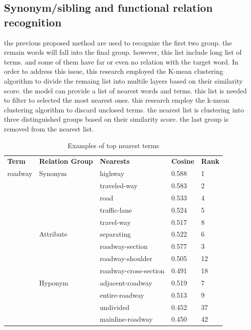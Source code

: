 \documentclass[Journal, InsideFigs, DoubleSpace]{ascelike} %
\begin{document}
\subsection{Synonym/sibling and functional relation recognition}
the previous proposed method are used to recognize the first two group. the remain words will fall into the final group. however, this list include long list of terms. and some of them have far or even no relation with the target word. In order to address this issue, this research employed the K-mean clustering algorithm \cite{macqueen67} to divide the remaing list into multile layers based on their similarity score. the model can provide a list of nearest words and terms. this list is needed to filter to selected the most nearest ones. this research employ the k-mean clustering algorithm \cite{macqueen67} to discard unclosed terms. the nearest list is clustering into three distinguished groups based on their similarity score. the last group is removed from the nearest list.
%
\begin{table} [t]
	\caption{Examples of top nearest terms}
	\label{table:term_clustering}
	\centering
	\small
	\renewcommand{\arraystretch}{1.25}
	\begin{tabular}{l l l l l}
		\hline
		\textbf{Term}	&\textbf{Relation Group}	& \textbf{Nearests} & \textbf{Cosine} & \textbf{Rank}\\
		roadway			&Synonym					& highway & 0.588 & 1\\
						&							& traveled-way & 0.583 & 2\\
						&							& road & 0.533 & 4\\						
						&							& traffic-lane & 0.524 &5\\ 						
						&							& travel-way & 0.517 & 8\\  \cmidrule{2-5}
						&Attribute					& separating & 0.522 &6\\
						&							& roadway-section & 0.577 & 3\\						
						&							& roadway-shoulder & 0.505 & 12\\
						&							& roadway-cross-section & 0.491 & 18\\\cmidrule{2-5}						
						&Hyponym					& adjacent-roadway & 0.519 & 7\\
						&							& entire-roadway & 0.513 & 9\\
						&							& undivided & 0.452 & 37\\
						&							& mainline-roadway & 0.450 & 42\\
		\hline
	\end{tabular}
	\normalsize
\end{table}
\end{document}
